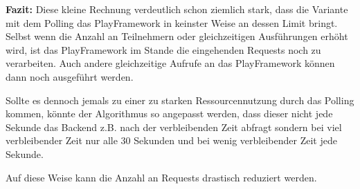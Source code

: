 \textbf{Fazit:} Diese kleine Rechnung verdeutlich schon ziemlich stark, dass die Variante mit dem Polling das PlayFramework in keinster Weise an dessen Limit bringt. Selbst wenn die Anzahl an Teilnehmern oder gleichzeitigen Ausführungen erhöht wird, ist das PlayFramework im Stande die eingehenden Requests noch zu verarbeiten. Auch andere gleichzeitige Aufrufe an das PlayFramework können dann noch ausgeführt werden.

Sollte es dennoch jemals zu einer zu starken Ressourcennutzung durch das Polling kommen, könnte der Algorithmus so angepasst werden, dass dieser nicht jede Sekunde das Backend z.B. nach der verbleibenden Zeit abfragt sondern bei viel verbleibender Zeit nur alle 30 Sekunden und bei wenig verbleibender Zeit jede Sekunde.

Auf diese Weise kann die Anzahl an Requests drastisch reduziert werden.
